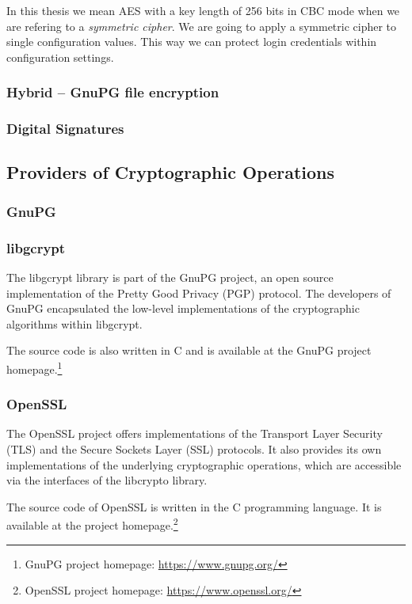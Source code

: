 In this thesis we mean AES with a key length of 256 bits in CBC mode when we are refering to a \emph{symmetric cipher}.
We are going to apply a symmetric cipher to single configuration values.
This way we can protect login credentials within configuration settings.

\subsubsection{Hybrid -- GnuPG file encryption}



\subsubsection{Digital Signatures}


\subsection{Providers of Cryptographic Operations}

  \subsubsection{GnuPG}

  \subsubsection{libgcrypt}

The libgcrypt library is part of the GnuPG project, an open source implementation of the Pretty Good Privacy (PGP) protocol.
The developers of GnuPG encapsulated the low-level implementations of the cryptographic algorithms within libgcrypt.

The source code is also written in C and is available at the GnuPG project homepage.\footnote{GnuPG project homepage: \url{https://www.gnupg.org/}}

  \subsubsection{OpenSSL}

The OpenSSL project offers implementations of the Transport Layer Security (TLS) and the Secure Sockets Layer (SSL) protocols.
It also provides its own implementations of the underlying cryptographic operations, which are accessible via the interfaces of the libcrypto library.

The source code of OpenSSL is written in the C programming language.
It is available at the project homepage.\footnote{OpenSSL project homepage: \url{https://www.openssl.org/}}

